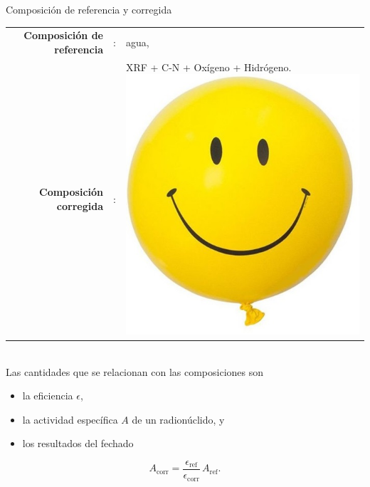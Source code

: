 \documentclass[9pt]{beamer}
\begin{document}
\begin{frame}{Composición de referencia y corregida}

	\begin{tabular}{rcl}
	\textbf{Composición de referencia} & : & agua, \\
	\textbf{Composición corregida} & : & XRF + C-N + Oxígeno + Hidrógeno. \includegraphics[scale=0.1]{Imagenes/CaritaFeliz2.jpg}
	\end{tabular}
	\\
	\vspace{0.5cm}
		\justifying   Las cantidades que se relacionan con las composiciones son
	\begin{itemize}
	\item la eficiencia $\epsilon$, 
	\item la actividad específica $A$ de un radionúclido, y
	\item los resultados del fechado
	\end{itemize}

	\begin{equation}\label{Eq-ActividadCorregida}
		A_\text{corr} = \dfrac{\epsilon_\text{ref}}{\epsilon_{\text{corr}}}\,A_\text{ref}.
	\end{equation}
\end{frame}
\end{document}
